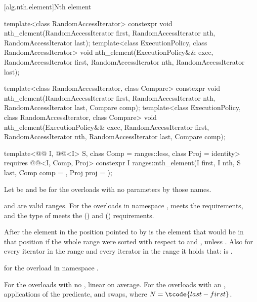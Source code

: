 [alg.nth.element]{Nth element}

%
\begin{itemdecl}
template<class RandomAccessIterator>
  constexpr void nth_element(RandomAccessIterator first, RandomAccessIterator nth,
                             RandomAccessIterator last);
template<class ExecutionPolicy, class RandomAccessIterator>
  void nth_element(ExecutionPolicy&& exec,
                   RandomAccessIterator first, RandomAccessIterator nth,
                   RandomAccessIterator last);

template<class RandomAccessIterator, class Compare>
  constexpr void nth_element(RandomAccessIterator first, RandomAccessIterator nth,
                             RandomAccessIterator last,  Compare comp);
template<class ExecutionPolicy, class RandomAccessIterator, class Compare>
  void nth_element(ExecutionPolicy&& exec,
                   RandomAccessIterator first, RandomAccessIterator nth,
                   RandomAccessIterator last, Compare comp);

template<@@ I, @@<I> S, class Comp = ranges::less,
         class Proj = identity>
  requires @@<I, Comp, Proj>
  constexpr I
    ranges::nth_element(I first, I nth, S last, Comp comp = {}, Proj proj = {});
\end{itemdecl}

\begin{itemdescr}
\pnum
Let  be 
and  be 
for the overloads with no parameters by those names.

\pnum
\expects
{} and  are valid ranges.
For the overloads in namespace ,
 meets
the  requirements, and
the type of  meets
the  () and
 () requirements.

\pnum
\effects
After  the element in the position pointed to by 
is the element that would be in that position
if the whole range were sorted with respect to  and ,
unless .
Also for every iterator  in the range 
and every iterator  in the range 
it holds that:
 is .

\pnum
\returns
{} for the overload in namespace .

\pnum
\complexity
For the overloads with no , linear on average.
For the overloads with an ,  applications of
the predicate, and  swaps, where $N = \tcode{last - first}$.
\end{itemdescr}

